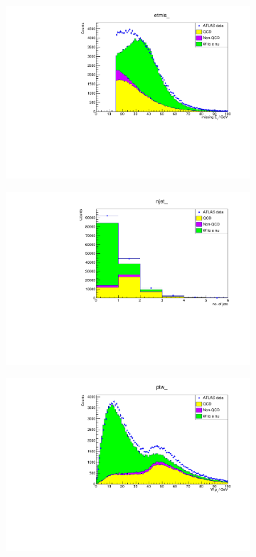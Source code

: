 \documentclass[11pt,a4paper,notitlepage]{scrartcl}
\begin{document}
\begin{figure}[H]
\begin{subfigure}{0.49\linewidth}
		\includegraphics[width=\linewidth]{P1_pics/cuts/etmis_qcd_eyeball.pdf}
		\caption{}
	\end{subfigure}
	\begin{subfigure}{0.49\linewidth}
		\includegraphics[width=\linewidth]{P1_pics/cuts/njet_qcd_eyeball.pdf}
		\caption{}
	\end{subfigure}
	\begin{subfigure}{0.49\linewidth}
		\includegraphics[width=\linewidth]{P1_pics/cuts/ptw_qcd_eyeball.pdf}

\end{subfigure}
\end{figure}
\end{document}

